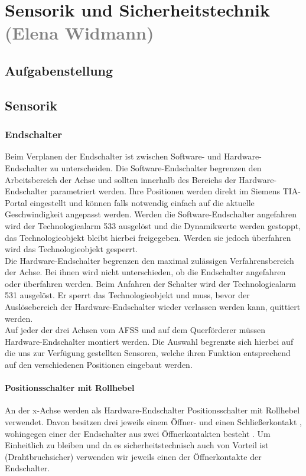 \section{Sensorik und Sicherheitstechnik \textcolor{gray}{(Elena Widmann)}}

\subsection{Aufgabenstellung}

\subsection{Sensorik}

\subsubsection{Endschalter}
Beim Verplanen der Endschalter ist zwischen Software- und Hardware-Endschalter zu unterscheiden. Die Software-Endschalter begrenzen den Arbeitsbereich der Achse und sollten innerhalb des Bereichs der Hardware-Endschalter parametriert werden. Ihre Positionen werden direkt im Siemens TIA-Portal eingestellt und können falls notwendig einfach auf die aktuelle Geschwindigkeit angepasst werden. Werden die Software-Endschalter angefahren wird der Technologiealarm 533 ausgelöst und die Dynamikwerte werden gestoppt, das Technologieobjekt bleibt hierbei freigegeben. Werden sie jedoch überfahren wird das Technologieobjekt gesperrt. \\
Die Hardware-Endschalter begrenzen den maximal zulässigen Verfahrensbereich der Achse. Bei ihnen wird nicht unterschieden, ob die Endschalter angefahren oder überfahren werden. Beim Anfahren der Schalter wird der Technologiealarm 531 ausgelöst. Er sperrt das Technologieobjekt und muss, bevor der Auslösebereich der Hardware-Endschalter wieder verlassen werden kann, quittiert werden. \cite{axis_manual}\\
Auf jeder der drei Achsen vom AFSS und auf dem Querförderer müssen Hardware-Endschalter montiert werden. Die Auswahl begrenzte sich hierbei auf die uns zur Verfügung gestellten Sensoren, welche ihren Funktion entsprechend auf den verschiedenen Positionen eingebaut werden.

\paragraph{Positionsschalter mit Rollhebel}
An der x-Achse werden als Hardware-Endschalter Positionsschalter mit Rollhebel verwendet. Davon besitzen drei jeweils einem Öffner- und einen Schließerkontakt \cite{schmersal_3}, wohingegen einer der Endschalter aus zwei Öffnerkontakten besteht \cite{schmersal_1}. Um Einheitlich zu bleiben und da es sicherheitstechnisch auch von Vorteil ist (Drahtbruchsicher) verwenden wir jeweils einen der Öffnerkontakte der Endschalter.

